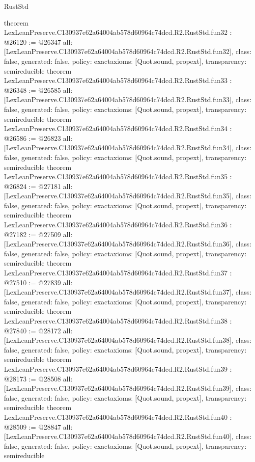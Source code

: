 \begin{lexlean}{RustStd}
\begin{coremodule}
{}
theorem LexLeanPreserve.C130937e62a64004ab578d60964c74dcd.R2.RustStd.fun32 : @26120 := @26347 {
  all: [LexLeanPreserve.C130937e62a64004ab578d60964c74dcd.R2.RustStd.fun32],
  class: false,
  generated: false,
  policy: exact{axioms: [Quot.sound, propext]},
  transparency: semireducible
}
theorem LexLeanPreserve.C130937e62a64004ab578d60964c74dcd.R2.RustStd.fun33 : @26348 := @26585 {
  all: [LexLeanPreserve.C130937e62a64004ab578d60964c74dcd.R2.RustStd.fun33],
  class: false,
  generated: false,
  policy: exact{axioms: [Quot.sound, propext]},
  transparency: semireducible
}
theorem LexLeanPreserve.C130937e62a64004ab578d60964c74dcd.R2.RustStd.fun34 : @26586 := @26823 {
  all: [LexLeanPreserve.C130937e62a64004ab578d60964c74dcd.R2.RustStd.fun34],
  class: false,
  generated: false,
  policy: exact{axioms: [Quot.sound, propext]},
  transparency: semireducible
}
theorem LexLeanPreserve.C130937e62a64004ab578d60964c74dcd.R2.RustStd.fun35 : @26824 := @27181 {
  all: [LexLeanPreserve.C130937e62a64004ab578d60964c74dcd.R2.RustStd.fun35],
  class: false,
  generated: false,
  policy: exact{axioms: [Quot.sound, propext]},
  transparency: semireducible
}
theorem LexLeanPreserve.C130937e62a64004ab578d60964c74dcd.R2.RustStd.fun36 : @27182 := @27509 {
  all: [LexLeanPreserve.C130937e62a64004ab578d60964c74dcd.R2.RustStd.fun36],
  class: false,
  generated: false,
  policy: exact{axioms: [Quot.sound, propext]},
  transparency: semireducible
}
theorem LexLeanPreserve.C130937e62a64004ab578d60964c74dcd.R2.RustStd.fun37 : @27510 := @27839 {
  all: [LexLeanPreserve.C130937e62a64004ab578d60964c74dcd.R2.RustStd.fun37],
  class: false,
  generated: false,
  policy: exact{axioms: [Quot.sound, propext]},
  transparency: semireducible
}
theorem LexLeanPreserve.C130937e62a64004ab578d60964c74dcd.R2.RustStd.fun38 : @27840 := @28172 {
  all: [LexLeanPreserve.C130937e62a64004ab578d60964c74dcd.R2.RustStd.fun38],
  class: false,
  generated: false,
  policy: exact{axioms: [Quot.sound, propext]},
  transparency: semireducible
}
theorem LexLeanPreserve.C130937e62a64004ab578d60964c74dcd.R2.RustStd.fun39 : @28173 := @28508 {
  all: [LexLeanPreserve.C130937e62a64004ab578d60964c74dcd.R2.RustStd.fun39],
  class: false,
  generated: false,
  policy: exact{axioms: [Quot.sound, propext]},
  transparency: semireducible
}
theorem LexLeanPreserve.C130937e62a64004ab578d60964c74dcd.R2.RustStd.fun40 : @28509 := @28847 {
  all: [LexLeanPreserve.C130937e62a64004ab578d60964c74dcd.R2.RustStd.fun40],
  class: false,
  generated: false,
  policy: exact{axioms: [Quot.sound, propext]},
  transparency: semireducible
}
\end{coremodule}
\end{lexlean}
